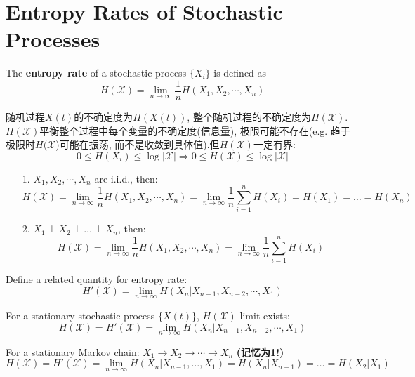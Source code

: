 \section{Entropy Rates of Stochastic Processes}


\begin{definition}
The \textbf{entropy rate} of a stochastic process $\{X_i\}$ is defined as
$$H\left(\mathcal{X}\right) = \lim_{n\to\infty} \frac{1}{n}H(X_1,X_2,\cdots,X_n)$$
\end{definition}
随机过程$X(t)$的不确定度为$H(X(t))$, 整个随机过程的不确定度为$H\left(\mathcal{X}\right)$. $H\left(\mathcal{X}\right)$平衡整个过程中每个变量的不确定度(信息量), 极限可能不存在(e.g. 趋于极限时$H(\mathcal{X}$)可能在振荡, 而不是收敛到具体值).但$H\left(\mathcal{X}\right)$一定有界:
$$0\leq H(X_i)\leq \log|\mathcal{X}| \Rightarrow 0\leq H\left(\mathcal{X}\right)\leq \log|\mathcal{X}|$$

\begin{example}
\begin{itemize}
\item[1.] $X_1,X_2,\cdots,X_n$ are i.i.d., then:
$$H\left(\mathcal{X}\right) = \lim_{n\to\infty} \dfrac{1}{n}H(X_1,X_2,\cdots,X_n) = \lim_{n\to\infty} \dfrac{1}{n}\sum_{i=1}^nH(X_i) = H(X_1) = \ldots = H(X_n)$$

\item[2.] $X_1\perp X_2\perp\ldots\perp X_n$, then:
$$H\left(\mathcal{X}\right)=\lim_{n\to\infty}\dfrac{1}{n}H(X_1,X_2,\cdots,X_n) = \lim_{n\to\infty}\dfrac{1}{n}\sum_{i=1}^nH(X_i)$$

\end{itemize}
\end{example}

\begin{definition}
Define a related quantity for entropy rate:
$$H'\left(\mathcal{X}\right) = \lim_{n\to\infty}H(X_n|X_{n-1},X_{n-2},\cdots,X_1)$$
\end{definition}

\begin{theorem}
For a stationary stochastic process $\{X(t)\}$, $H\left(\mathcal{X}\right)$ limit exists:
$$H\left(\mathcal{X}\right) = H'\left(\mathcal{X}\right) = \lim_{n\to\infty}H(X_n|X_{n-1},X_{n-2},\cdots,X_1)$$
\end{theorem}

\begin{example}
For a stationary Markov chain: $X_1\rightarrow X_2\rightarrow\cdots\rightarrow X_n$ \textbf{(记忆为1!)}
$$H\left(\mathcal{X}\right)=H'\left(\mathcal{X}\right)=\lim_{n\to\infty}H(X_n|X_{n-1},\ldots,X_1)=H(X_n|X_{n-1})=\ldots=H(X_2|X_1)$$
\end{example}